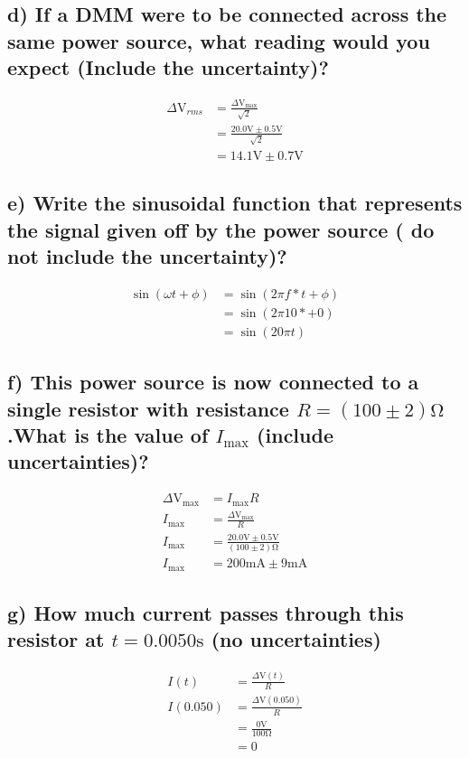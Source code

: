 \documentclass{report}
\begin{document}
\subsection*{d) If a DMM were to be connected across the same power source, what reading would you expect (Include the uncertainty)?}
    \begin{align}
    \Delta\si{\volt}_{rms}&=\frac{\Delta\si{\volt}_{\max}}{\sqrt{2}} \nonumber\\
    &=\frac{20.0\si{\volt}\pm0.5\si{\volt}}{\sqrt{2}}\nonumber\\
    &=14.1\si{\volt}\pm0.7\si{\volt}
    \end{align}

\subsection*{e) Write the sinusoidal function that represents the signal given off by the power source ( do not include the uncertainty)?}
    \begin{align}
        \sin(\omega t + \phi)&=\sin(2\pi f*t + \phi)\nonumber\\
        &=\sin(2\pi 10* + 0)\nonumber\\
        &=\sin(20\pi t)
    \end{align}

\subsection*{f) This power source is now connected to a single resistor with resistance $R = ( 100\pm2 )\si{\ohm}$.What is the value of $I_{\max}$ (include uncertainties)?}
    \begin{align}
        \Delta\si{\volt}_{\max}&=I_{\max}R\nonumber\\
        I_{\max}&=\frac{\Delta\si{\volt}_{\max}}{R}\nonumber\\
        I_{\max}&=\frac{20.0\si{\volt}\pm0.5\si{\volt}}{( 100\pm2 )\si{\ohm}}\nonumber\\
        I_{\max}&=200\si{\milli\ampere}\pm9\si{\milli\ampere}
    \end{align}

\subsection*{g) How much current passes through this resistor at $t = 0.0050\si{\second}$ (no uncertainties) }
    \begin{align}
        I(t)&=\frac{\Delta\si{\volt}(t)}{R}\nonumber\\
        I(0.050)&=\frac{\Delta\si{\volt}(0.050)}{R}\nonumber\\
        &=\frac{0\si{\volt}}{100\si{\ohm}}\nonumber\\
        &=0
    \end{align}
\end{document}
